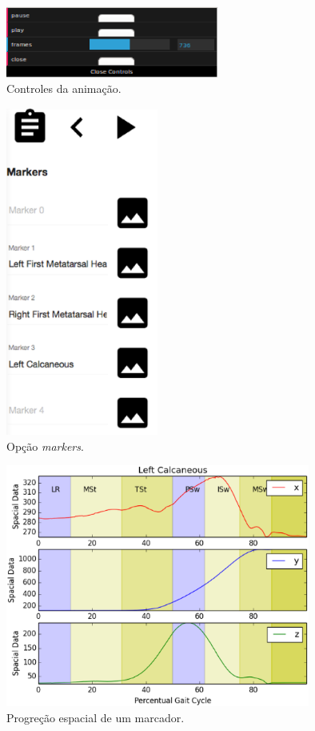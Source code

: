 \begin{figure}[ht]
	\centering
	\includegraphics[width=7cm]{figuras/tela17.eps}
	\caption{Controles da animação.}
	\label{animacao5}
\end{figure}



\begin{figure}[ht]
	\centering
	\includegraphics[width=5cm]{figuras/tela18.eps}
	\caption{Opção \emph{markers}.}
	\label{tela18}
\end{figure}


\begin{figure}[ht]
	\centering
	\includegraphics[width=10cm]{figuras/tela19.eps}
	\caption{Progreção espacial de um marcador.}
	\label{tela19}
\end{figure}

